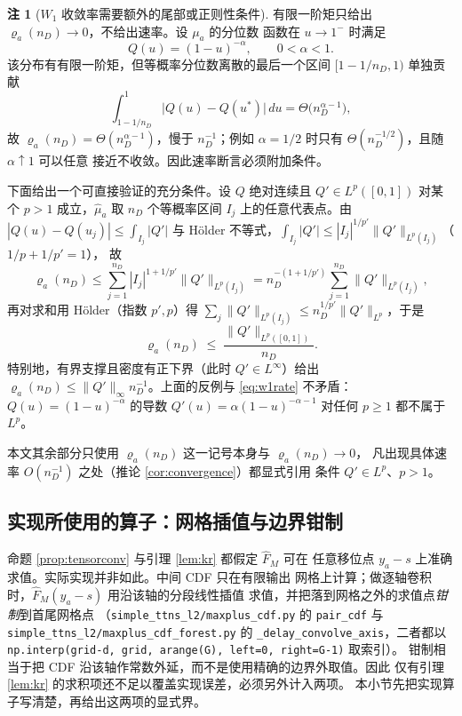 \documentclass[a4paper,11pt]{article}
\theoremstyle{definition}
\newtheorem{remark}{注}
\newcommand{\1}{\mathbf 1}
\begin{document}
\begin{remark}[$W_1$ 收敛率需要额外的尾部或正则性条件]
\label{rem:w1rate}
有限一阶矩只给出 $\varrho_a(n_D)\to0$，不给出速率。设 $\mu_a$ 的分位数
函数在 $u\to1^-$ 时满足
\[
Q(u)=(1-u)^{-\alpha},
\qquad 0<\alpha<1 .
\]
该分布有有限一阶矩，但等概率分位数离散的最后一个区间
$[1-1/n_D,1)$ 单独贡献
\[
\int_{1-1/n_D}^{1}\bigl|Q(u)-Q(u^\ast)\bigr|\,du
=
\Theta\bigl(n_D^{\alpha-1}\bigr),
\]
故 $\varrho_a(n_D)=\Theta(n_D^{\alpha-1})$，慢于 $n_D^{-1}$；例如
$\alpha=1/2$ 时只有 $\Theta(n_D^{-1/2})$，且随 $\alpha\uparrow1$ 可以任意
接近不收敛。因此速率断言必须附加条件。

下面给出一个可直接验证的充分条件。设 $Q$ 绝对连续且
$Q'\in L^p([0,1])$ 对某个 $p>1$ 成立，$\widehat\mu_a$ 取 $n_D$ 个等概率区间
$I_j$ 上的任意代表点。由 $|Q(u)-Q(u_j)|\le\int_{I_j}|Q'|$ 与 H\"older
不等式，$\int_{I_j}|Q'|\le|I_j|^{1/p'}\|Q'\|_{L^p(I_j)}$（$1/p+1/p'=1$），
故
\[
\varrho_a(n_D)
\le
\sum_{j=1}^{n_D}|I_j|^{1+1/p'}\|Q'\|_{L^p(I_j)}
=
n_D^{-(1+1/p')}\sum_{j=1}^{n_D}\|Q'\|_{L^p(I_j)},
\]
再对求和用 H\"older（指数 $p',p$）得
$\sum_j\|Q'\|_{L^p(I_j)}\le n_D^{1/p'}\|Q'\|_{L^p}$，于是
\begin{equation}
\label{eq:w1rate}
\varrho_a(n_D)\;\le\;\frac{\|Q'\|_{L^p([0,1])}}{n_D}.
\end{equation}
特别地，有界支撑且密度有正下界（此时 $Q'\in L^\infty$）给出
$\varrho_a(n_D)\le\|Q'\|_\infty n_D^{-1}$。上面的反例与
\eqref{eq:w1rate} 不矛盾：$Q(u)=(1-u)^{-\alpha}$ 的导数
$Q'(u)=\alpha(1-u)^{-\alpha-1}$ 对任何 $p\ge1$ 都不属于 $L^p$。

本文其余部分只使用 $\varrho_a(n_D)$ 这一记号本身与 $\varrho_a(n_D)\to0$，
凡出现具体速率 $O(n_D^{-1})$ 之处（推论 \ref{cor:convergence}）都显式引用
条件 $Q'\in L^p$、$p>1$。
\end{remark}

\subsection{实现所使用的算子：网格插值与边界钳制}

命题 \ref{prop:tensorconv} 与引理 \ref{lem:kr} 都假定 $\widehat F_M$ 可在
任意移位点 $y_a-s$ 上准确求值。实际实现并非如此。中间 CDF 只在有限输出
网格上计算；做逐轴卷积时，$\widehat F_M(y_a-s)$ 用沿该轴的分段线性插值
求值，并把落到网格之外的求值点\emph{钳制}到首尾网格点
（\texttt{simple\_ttns\_l2/}\allowbreak\texttt{maxplus\_cdf.py} 的
\texttt{pair\_cdf} 与
\texttt{simple\_ttns\_l2/}\allowbreak\texttt{maxplus\_cdf\_forest.py} 的
\texttt{\_delay\_convolve\_axis}，二者都以
\texttt{np.interp(grid-d, grid, arange(G), left=0, right=G-1)} 取索引）。
钳制相当于把 CDF 沿该轴作常数外延，而不是使用精确的边界外取值。因此
仅有引理 \ref{lem:kr} 的求积项还不足以覆盖实现误差，必须另外计入两项。
本小节先把实现算子写清楚，再给出这两项的显式界。
\end{document}
